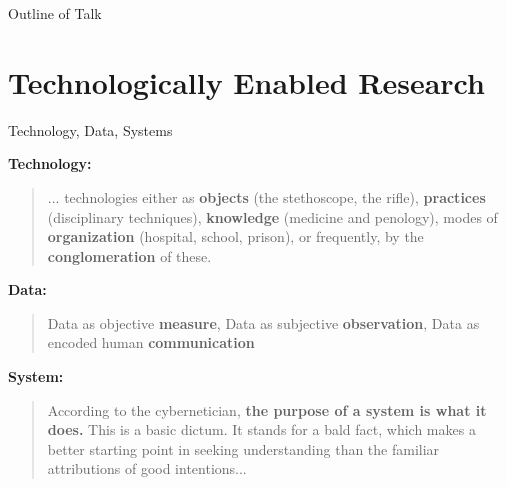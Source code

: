 \documentclass[aspectratio=169, 11pt]{beamer} %
\begin{document}
\begin{frame}{Outline of Talk}
  \tableofcontents
\end{frame}



\section{Technologically Enabled Research}

\begin{frame}{Technology, Data, Systems}

\textbf{Technology:} \begin{quote}
... technologies either as
\textbf{objects} (the stethoscope, the rifle), \textbf{practices} (disciplinary techniques), \textbf{knowledge} (medicine and penology), modes of \textbf{organization} (hospital, school, prison), or frequently,
by the \textbf{conglomeration} of these. \parencite{Lagdameo2019-sa}
\end{quote} 

\textbf{Data:}
\begin{quote}
Data as objective \textbf{measure}, Data as subjective \textbf{observation}, Data as encoded human \textbf{communication} \parencite{Ballsun-Stanton2012-nx}
\end{quote}

\textbf{System:}
\begin{quote}
According to the
cybernetician, \textbf{the purpose of a system is what it does.} This is a basic dictum. It stands for a bald fact, which makes a better starting point in seeking understanding than the familiar
attributions of good intentions... \parencite{Beer2002-tl}
\end{quote} 
\end{frame}
\end{document}
